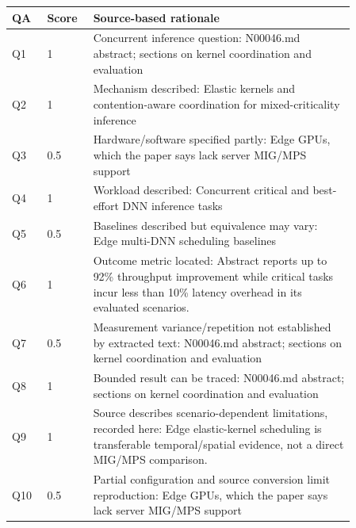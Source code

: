 \begin{longtable}{P{0.09\linewidth}P{0.10\linewidth}P{0.67\linewidth}}
\toprule QA & Score & Source-based rationale\\\midrule\endhead
Q1 & 1 & Concurrent inference question: N00046.md abstract; sections on kernel coordination and evaluation\\
Q2 & 1 & Mechanism described: Elastic kernels and contention-aware coordination for mixed-criticality inference\\
Q3 & 0.5 & Hardware/software specified partly: Edge GPUs, which the paper says lack server MIG/MPS support\\
Q4 & 1 & Workload described: Concurrent critical and best-effort DNN inference tasks\\
Q5 & 0.5 & Baselines described but equivalence may vary: Edge multi-DNN scheduling baselines\\
Q6 & 1 & Outcome metric located: Abstract reports up to 92\% throughput improvement while critical tasks incur less than 10\% latency overhead in its evaluated scenarios.\\
Q7 & 0.5 & Measurement variance/repetition not established by extracted text: N00046.md abstract; sections on kernel coordination and evaluation\\
Q8 & 1 & Bounded result can be traced: N00046.md abstract; sections on kernel coordination and evaluation\\
Q9 & 1 & Source describes scenario-dependent limitations, recorded here: Edge elastic-kernel scheduling is transferable temporal/spatial evidence, not a direct MIG/MPS comparison.\\
Q10 & 0.5 & Partial configuration and source conversion limit reproduction: Edge GPUs, which the paper says lack server MIG/MPS support\\
\bottomrule\end{longtable}

